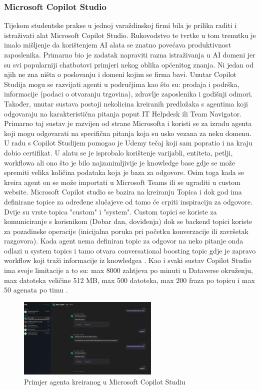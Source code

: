 \documentclass[]{foi}
\begin{document}
\subsubsection{Microsoft Copilot Studio}
Tijekom studentske prakse u jednoj varaždinskoj firmi bila je prilika raditi i istraživati alat Microsoft Copilot Studio. Rukovodstvo te tvrtke u tom trenutku je imalo mišljenje da korištenjem 
AI alata se znatno povećava produktivnost zaposlenika. Primarno bio je zadatak napraviti razna istraživanja u AI domeni jer su svi popularniji chatbotovi primjeri nekog oblika općenitog znanja. 
Ni jedan od njih ne zna ništa o poslovanju i domeni kojim se firma bavi. Unutar Copilot Studija mogu se razvijati agenti u područjima kao što su: prodaja i podrška, informacije (podaci o otvaranju trgovina), 
zdravlje zaposlenika i godišnji odmori. Također, unutar sustava postoji nekolicina kreiranih predložaka s agentima koji odgovaraju na karakteristična pitanja poput IT Helpdesk ili Team Navigator. 
Primarno taj sustav je razvijen od strane Microsofta i koristi se za izradu agenta koji mogu odgovarati na specifična pitanja koja su usko vezana za neku domenu. U radu s Copilot Studijem 
pomogao je Udemy tečaj koji sam popratio i na kraju dobio certifikat. U alatu se je isprobalo korištenje varijabli, entiteta, petlji, workflowa ali ono što je bilo najzanimljivije je knowledge 
base gdje se može spremiti velika količina podataka koja je baza za odgovore. Osim toga kada se kreira agent on se može importati u Microsoft Teams ili se ugraditi u custom website.
Microsoft Copilot studio se bazira na kreiranju Topica i dok god ima definirane topice za određene slučajeve od tamo će crpiti inspiraciju za odgovore. Dvije su vrste topica "custom" i "system". 
Custom topici se koriste za komuniciranje s korisnikom (Dobar dan, doviđenja) dok se backend topici koriste za pozadinske operacije (inicijalna poruka pri početku konverzacije ili završetak razgovora).
Kada agent nema definiran topic za odgovor na neko pitanje onda odlazi u system topics i tamo otvara conversational boosting topic gdje je zapravo workflow koji traži informacije iz knowledgea \cite{copilot2025}.
Kao i svaki sustav Copilot Studio ima svoje limitacije a to su: max 8000 zahtjeva po minuti u Dataverse okruženju, max datoteka veličine 512 MB, max 500 datoteka, max 200 fraza po topicu i max 50 agenata po timu \cite{quotas2025}.

\begin{figure}[ht!]
    \centering
    \includegraphics[width=0.6\textwidth]{./assets/Primjer_agenta_kreiranog_u_Copilot_Studiu.png} 
    \caption{Primjer agenta kreiranog u Microsoft Copilot Studiu}
    \label{fig:slika2}
\end{figure}
\end{document}
